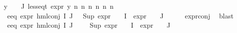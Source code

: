 \begin{isabellebody}
{\isachardoublequoteopen}{\isacharparenleft}{\kern0pt}{\isasymforall}y\ {\isasymin}\ {\isacharparenleft}{\kern0pt}{\isasymPhi}\ {\isacharbackquote}{\kern0pt}\ J{\isacharparenright}{\kern0pt}{\isachardot}{\kern0pt}\ less{\isacharunderscore}{\kern0pt}eq{\isacharunderscore}{\kern0pt}t\ {\isacharparenleft}{\kern0pt}expr\ y{\isacharparenright}{\kern0pt}\ {\isacharparenleft}{\kern0pt}n{}{\isacharcomma}{\kern0pt}\ n{}{\isacharcomma}{\kern0pt}\ n{}{\isacharcomma}{\kern0pt}\ n{}{\isacharcomma}{\kern0pt}\ n{}{\isacharcomma}{\kern0pt}\ n{}{\isacharparenright}{\kern0pt}{\isacharparenright}{\kern0pt}{\isachardoublequoteclose}\isanewline
%
\isadelimproof
%
\endisadelimproof
%
\isatagproof
{}\isamarkupfalse%
{\isacharminus}{\kern0pt}\isanewline
\ \ \isamarkupfalse%
\ e{}{\isacharunderscore}{\kern0pt}eq{\isacharcolon}{\kern0pt}\ {\isachardoublequoteopen}expr{\isacharunderscore}{\kern0pt}{}\ {\isacharparenleft}{\kern0pt}hml{\isacharunderscore}{\kern0pt}conj\ I\ J\ {\isasymPhi}{\isacharparenright}{\kern0pt}\ {\isacharequal}{\kern0pt}\ Sup\ {\isacharparenleft}{\kern0pt}{\isacharparenleft}{\kern0pt}expr{\isacharunderscore}{\kern0pt}{}\ {\isasymcirc}\ {\isasymPhi}{\isacharparenright}{\kern0pt}\ {\isacharbackquote}{\kern0pt}\ I\ {\isasymunion}\ {\isacharparenleft}{\kern0pt}expr{\isacharunderscore}{\kern0pt}{}\ {\isasymcirc}\ {\isasymPhi}{\isacharparenright}{\kern0pt}\ {\isacharbackquote}{\kern0pt}\ J{\isacharparenright}{\kern0pt}{\isachardoublequoteclose}\isanewline
\ \ \ \ \isamarkupfalse%
\ expr{\isacharunderscore}{\kern0pt}{}{\isacharunderscore}{\kern0pt}conj\ \isamarkupfalse%
\ blast\isanewline
\ \ \isamarkupfalse%
\ e{}{\isacharunderscore}{\kern0pt}eq{\isacharcolon}{\kern0pt}\ {\isachardoublequoteopen}expr{\isacharunderscore}{\kern0pt}{}\ {\isacharparenleft}{\kern0pt}hml{\isacharunderscore}{\kern0pt}conj\ I\ J\ {\isasymPhi}{\isacharparenright}{\kern0pt}\ {\isacharequal}{\kern0pt}\ {}\ {\isacharplus}{\kern0pt}\ Sup\ {\isacharparenleft}{\kern0pt}{\isacharparenleft}{\kern0pt}expr{\isacharunderscore}{\kern0pt}{}\ {\isasymcirc}\ {\isasymPhi}{\isacharparenright}{\kern0pt}\ {\isacharbackquote}{\kern0pt}\ I\ {\isasymunion}\ {\isacharparenleft}{\kern0pt}expr{\isacharunderscore}{\kern0pt}{}\ {\isasymcirc}\ {\isasymPhi}{\isacharparenright}{\kern0pt}\ {\isacharbackquote}{\kern0pt}\ J{\isacharparenright}{\kern0pt}{\isachardoublequoteclose}\isanewline

\end{isabellebody}
